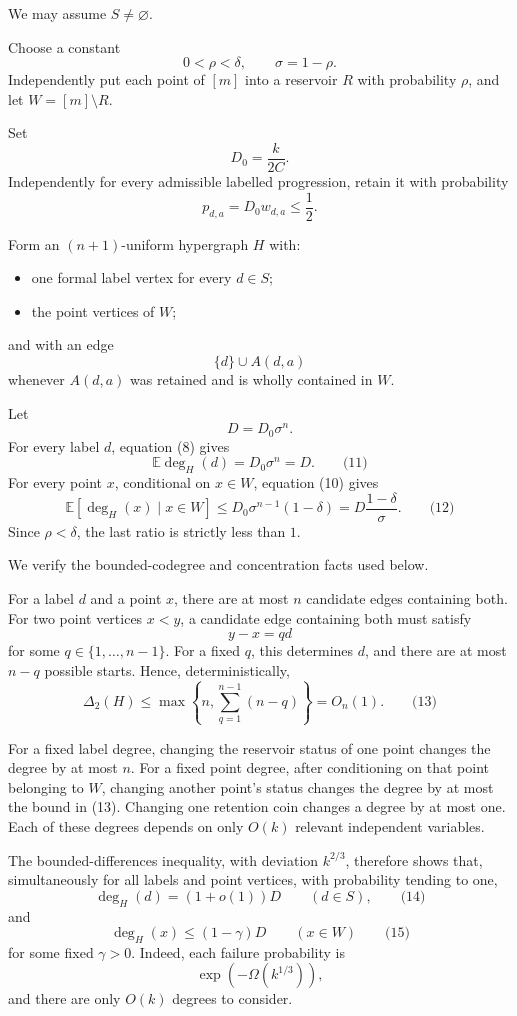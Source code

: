 \documentclass[
  11pt,
  a4paper,
]{article}
\providecommand{\tightlist}{%
  \setlength{\itemsep}{0pt}\setlength{\parskip}{0pt}}
\begin{document}
We may assume \(S\ne\varnothing\).

Choose a constant \[
0<\rho<\delta,
\qquad \sigma=1-\rho.
\] Independently put each point of \([m]\) into a reservoir \(R\) with
probability \(\rho\), and let \(W=[m]\setminus R\).

Set \[
D_0=\frac{k}{2C}.
\] Independently for every admissible labelled progression, retain it
with probability \[
p_{d,a}=D_0w_{d,a}\le\frac12.
\]

Form an \((n+1)\)-uniform hypergraph \(H\) with:

\begin{itemize}
\tightlist
\item
  one formal label vertex for every \(d\in S\);
\item
  the point vertices of \(W\);
\end{itemize}

and with an edge \[
\{d\}\cup A(d,a)
\] whenever \(A(d,a)\) was retained and is wholly contained in \(W\).

Let \[
D=D_0\sigma^n.
\] For every label \(d\), equation (8) gives \[
\mathbb E\deg_H(d)=D_0\sigma^n=D.
\qquad\text{(11)}
\] For every point \(x\), conditional on \(x\in W\), equation (10) gives
\[
\mathbb E[\deg_H(x)\mid x\in W]
\le D_0\sigma^{n-1}(1-\delta)
=D\frac{1-\delta}{\sigma}.
\qquad\text{(12)}
\] Since \(\rho<\delta\), the last ratio is strictly less than \(1\).

We verify the bounded-codegree and concentration facts used below.

For a label \(d\) and a point \(x\), there are at most \(n\) candidate
edges containing both. For two point vertices \(x<y\), a candidate edge
containing both must satisfy \[
y-x=qd
\] for some \(q\in\{1,\ldots,n-1\}\). For a fixed \(q\), this determines
\(d\), and there are at most \(n-q\) possible starts. Hence,
deterministically, \[
\Delta_2(H)
\le \max\left\{n,\sum_{q=1}^{n-1}(n-q)\right\}
=O_n(1).
\qquad\text{(13)}
\]

For a fixed label degree, changing the reservoir status of one point
changes the degree by at most \(n\). For a fixed point degree, after
conditioning on that point belonging to \(W\), changing another point's
status changes the degree by at most the bound in (13). Changing one
retention coin changes a degree by at most one. Each of these degrees
depends on only \(O(k)\) relevant independent variables.

The bounded-differences inequality, with deviation \(k^{2/3}\),
therefore shows that, simultaneously for all labels and point vertices,
with probability tending to one, \[
\deg_H(d)=(1+o(1))D
\qquad(d\in S),
\qquad\text{(14)}
\] and \[
\deg_H(x)\le(1-\gamma)D
\qquad(x\in W)
\qquad\text{(15)}
\] for some fixed \(\gamma>0\). Indeed, each failure probability is \[
\exp(-\Omega(k^{1/3})),
\] and there are only \(O(k)\) degrees to consider.
\end{document}
